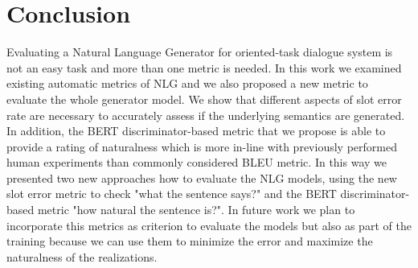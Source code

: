 \documentclass[11pt]{article}
\begin{document}
\section{Conclusion}

Evaluating a Natural Language Generator for oriented-task dialogue system is not an easy task and more than one metric is needed. In this work we examined existing automatic metrics of NLG and we also proposed a new metric to evaluate the whole generator model. We show that different aspects of slot error rate are necessary to accurately assess if the underlying semantics are generated. In addition, the BERT discriminator-based metric that we propose is able to provide a rating of naturalness which is more in-line with previously performed human experiments than commonly considered BLEU metric. In this way we presented two new approaches how to evaluate the NLG models, using the new slot error metric to check "what the sentence says?" and the BERT discriminator-based metric "how natural the sentence is?". In future work we plan  to incorporate this metrics as criterion to evaluate the models but also as part of the training because we can use them to minimize the error and maximize the naturalness of the realizations.



\newpage
 

\newpage




\end{document}
